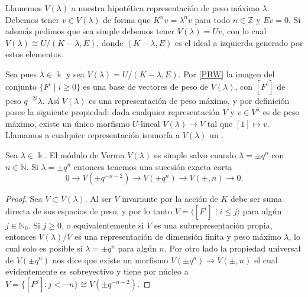 \documentclass[11pt,fleqn]{article}
\newcommand\NN{\mathbb N}
\newcommand\ZZ{\mathbb Z}
\renewcommand\k{\Bbbk}
\renewcommand\to{\longrightarrow}
\begin{document}
Llamemos $V(\lambda)$ a nuestra hipotética representación de peso máximo $\lambda$. 
Debemos tener $v \in V(\lambda)$ de forma que $K^n v = \lambda^n v$ para todo $n \in \ZZ$
y $Ev = 0$. Si además pedimos que sea simple debemos tener $V(\lambda) = Uv$, con lo cual
$V(\lambda) \cong U/(K-\lambda, E)$, donde $(K-\lambda, E)$ es el ideal a izquierda
generado por estos elementos.

Sea pues $\lambda \in \k$ y sea $V(\lambda) = U/(K-\lambda, E)$. Por \ref{PBW} la imagen 
del conjunto $\{F^i \mid i \geq 0\}$ es una base de vectores de peso de $V(\lambda)$, 
con $[F^i]$ de peso $q^{-2i}\lambda$. Así $V(\lambda)$ es una representación de peso 
máximo, y por definición posee la siguiente propiedad: dada cualquier representación $V$ 
y $v \in V^\lambda$ es de peso máximo, existe un único morfismo $U$-lineal $V(\lambda) 
\to V$ tal que $[1] \mapsto v$. Llamamos a cualquier representación isomorfa a 
$V(\lambda)$ un .

\begin{Proposition*}
Sea $\lambda \in \k$. El módulo de Verma $V(\lambda)$ es simple salvo cuando $\lambda = 
\pm q^n$ con $n \in \NN$. Si $\lambda = \pm q^n$ entonces tenemos una sucesión exacta
corta
\[
   0 \to V(\pm q^{-n-2}) \to V(\pm q^n) \to V(\pm, n) \to 0.
\]
\end{Proposition*}
\begin{proof}
Sea $V \subset V(\lambda)$. Al ser $V$ invariante por la acción de $K$ debe ser suma 
directa de sus espacios de peso, y por lo tanto $V = \langle [F^i] \mid i \leq j\rangle$
para algún $j \in \NN_0$. Si $j \geq 0$, o equivalentemente si $V$ es una 
subrepresentación propia, entonces $V(\lambda)/V$ es una representación de dimensión 
finita y peso máximo $\lambda$, lo cual solo es posible si $\lambda = \pm q^n$ para algún
$n$. Por otro lado la propiedad universal de $V(\pm q^n)$ nos dice que existe un morfismo
$V(\pm q^n) \to V(\pm, n)$ el cual evidentemente es sobreyectivo y tiene por núcleo a
$V = \{[F^j] : j < -n \} \cong V(\pm q^{-n-2})$.
\end{proof}
\end{document}
